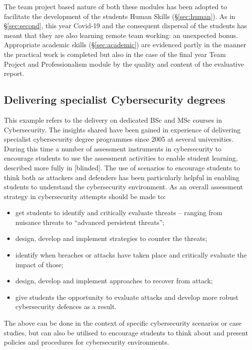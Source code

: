 \documentclass[conference]{IEEEtran}
\begin{document}
The team project based nature of both these modules has been adopted to facilitate the development of the students Human Skills (\S\ref{sec:human}). As in \S\ref{sec:second}, this year Covid-19 and the consequent dispersal of the students has meant that they are also learning remote team working: an unexpected bonus. Appropriate academic skills (\S\ref{sec:academic}) are evidenced partly in the manner the practical work is completed but also in the case of the final year Team Project and Professionalism module by the quality and content of the evaluative report.

\subsection{Delivering specialist Cybersecurity degrees}\label{sec:fourth} %
This example refers to the delivery on dedicated BSc and MSc courses in Cybersecurity. The insights shared have been gained in experience of delivering specialist cybersecurity degree programmes since 2005 at several universities. During this time a number of assessment instruments in cybersecurity to encourage students to use the assessment activities to enable student learning, described more fully in [blinded]. 
The use of scenarios to encourage students to think both as attackers and defenders has been particularly helpful in enabling students to understand the cybersecurity environment. As an overall assessment strategy in cybersecurity attempts should be made to: 
\begin{itemize}
\item get students to identify and critically evaluate threats – ranging from nuisance threats to “advanced persistent threats”;
\item design, develop and implement strategies to counter the threats;
\item identify when breaches or attacks have taken place and critically evaluate the impact of those;
\item design, develop and implement approaches to recover from attack;
\item give students the opportunity to evaluate attacks and develop more robust cybersecurity defences as a result.
\end{itemize}

The above can be done in the context of specific cybersecurity scenarios or case studies, but can also be utilised to encourage students to think about and present policies and procedures for cybersecurity environments. 
\end{document}
